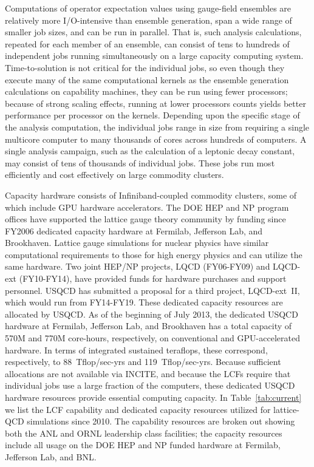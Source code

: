 Computations of operator expectation values using gauge-field ensembles are
relatively more I/O-intensive than ensemble generation, span a wide range of
smaller job sizes, and can be run in parallel.  That is, such analysis
calculations, repeated for each member of an ensemble, can consist of tens to
hundreds of independent jobs running simultaneously on a large capacity
computing system.  Time-to-solution is not critical for the individual jobs,
so even though they execute many of the same computational kernels as the
ensemble generation calculations on capability machines, they can be run using
fewer processors; because of strong scaling effects, running at lower
processors counts yields better performance per processor on the kernels.
Depending upon the specific stage of the analysis computation, the individual
jobs range in size from requiring a single multicore computer to many
thousands of cores across hundreds of computers.  A single analysis campaign,
such as the calculation of a leptonic decay constant, may consist of tens of
thousands of individual jobs.  These jobs run most efficiently and cost
effectively on large commodity clusters.

Capacity hardware consists of Infiniband-coupled commodity clusters, some of
which include GPU hardware
accelerators.  The DOE HEP and NP program offices have supported the lattice
gauge theory community by funding since FY2006 dedicated capacity hardware at
Fermilab, Jefferson Lab, and Brookhaven.  Lattice gauge simulations for
nuclear physics have similar computational requirements to those for high
energy physics and can utilize the same hardware.  Two joint HEP/NP projects,
LQCD (FY06-FY09) and LQCD-ext (FY10-FY14), have provided funds for hardware
purchases and support personnel.  USQCD has submitted a proposal for a third
project, LQCD-ext~II, which would run from FY14-FY19.  These dedicated capacity
resources are allocated by USQCD.  As of the beginning of July 2013, the
dedicated USQCD hardware at Fermilab, Jefferson Lab, and Brookhaven has a
total capacity of 570M and 770M core-hours, respectively, on conventional and
GPU-accelerated hardware.  In terms of integrated sustained teraflops, these
correspond, respectively, to 88~Tflop/sec-yrs and 119~Tflop/sec-yrs.
Because sufficient allocations are not available via INCITE, and because the LCFs require that individual jobs use a large fraction of the computers, these dedicated
USQCD hardware resources provide essential computing capacity.
In Table~\ref{tab:current} we list the LCF capability and dedicated
capacity resources utilized for lattice-QCD simulations since 2010.
The capability resources are broken out showing both the ANL and ORNL
leadership class facilities; the capacity resources include all usage  on the 
DOE HEP and NP funded hardware at Fermilab, Jefferson Lab, and BNL.

